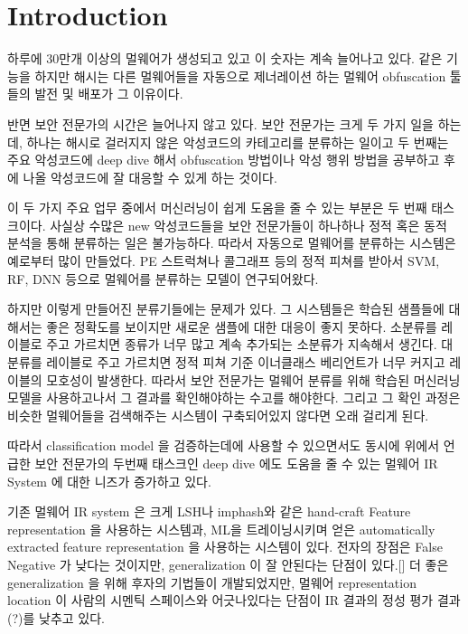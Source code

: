 \section{Introduction}

하루에 30만개 이상의 멀웨어가 생성되고 있고 이 숫자는 계속 늘어나고 있다. %
같은 기능을 하지만 해시는 다른 멀웨어들을 자동으로 제너레이션 하는 멀웨어 obfuscation 툴들의 발전 및 배포가 그 이유이다. 

반면 보안 전문가의 시간은 늘어나지 않고 있다. 보안 전문가는 크게 두 가지 일을 하는데, 하나는 해시로 걸러지지 않은 악성코드의 카테고리를 분류하는 일이고 두 번째는  주요 악성코드에 deep dive 해서 obfuscation 방법이나 악성 행위 방법을 공부하고 후에 나올 악성코드에 잘 대응할 수 있게 하는 것이다.   

이 두 가지 주요 업무 중에서 머신러닝이 쉽게 도움을 줄 수 있는 부분은 두 번째 태스크이다. 사실상 수많은 new 악성코드들을 보안 전문가들이 하나하나 정적 혹은 동적 분석을 통해 분류하는 일은 불가능하다. 따라서 자동으로 멀웨어를 분류하는 시스템은 예로부터 많이 만들었다. PE 스트럭쳐나 콜그래프 등의 정적 피쳐를 받아서 SVM, RF, DNN 등으로 멀웨어를 분류하는 모델이 연구되어왔다.   

하지만 이렇게 만들어진 분류기들에는 문제가 있다.%
 그 시스템들은 학습된 샘플들에 대해서는 좋은 정확도를 보이지만 새로운 샘플에 대한 대응이 좋지 못하다. 소분류를 레이블로 주고 가르치면 종류가 너무 많고 계속 추가되는 소분류가 지속해서 생긴다. 대분류를 레이블로 주고 가르치면 정적 피쳐 기준 이너클래스 베리언트가 너무 커지고 레이블의 모호성이 발생한다. 따라서 보안 전문가는 멀웨어 분류를 위해 학습된 머신러닝 모델을 사용하고나서 그 결과를 확인해야하는 수고를 해야한다. 그리고 그 확인 과정은 비슷한 멀웨어들을 검색해주는 시스템이 구축되어있지 않다면 오래 걸리게 된다.  

따라서 classification model 을 검증하는데에 사용할 수 있으면서도 동시에 위에서 언급한 보안 전문가의 두번째 태스크인 deep dive 에도 도움을 줄 수 있는 멀웨어 IR System 에 대한 니즈가 증가하고 있다.  
 
기존 멀웨어 IR system 은 크게 LSH나 imphash와 같은 hand-craft Feature representation 을 사용하는 시스템과, ML을 트레이닝시키며 얻은 automatically extracted feature representation 을 사용하는 시스템이 있다. 전자의 장점은 False Negative 가 낮다는 것이지만, generalization 이 잘 안된다는 단점이 있다.[] 더 좋은 generalization 을 위해 후자의 기법들이 개발되었지만, 멀웨어 representation location 이 사람의 시멘틱 스페이스와 어긋나있다는 단점이 IR 결과의 정성 평가 결과(?)를 낮추고 있다.   

